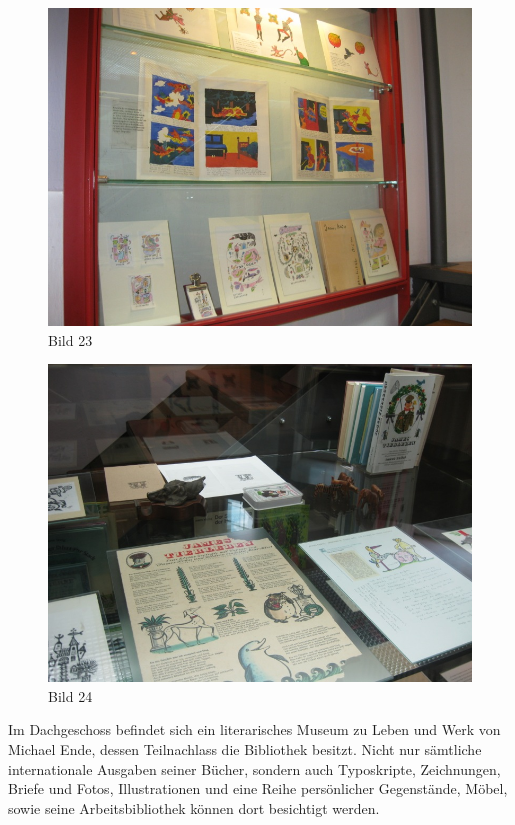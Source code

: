 \documentclass[a4paper,
fontsize=11pt,
oneside,
numbers=noperiodatend,
parskip=half-,
bibliography=totoc,
final
]{scrartcl}
\begin{document}
\begin{figure}[htbp]
\centering
\includegraphics{img/Bild23.jpg}
\caption{Bild 23}
\end{figure}

\begin{figure}[htbp]
\centering
\includegraphics{img/Bild24.jpg}
\caption{Bild 24}
\end{figure}

Im Dachgeschoss befindet sich ein literarisches Museum zu Leben und Werk
von Michael Ende, dessen Teilnachlass die Bibliothek besitzt. Nicht nur
sämtliche internationale Ausgaben seiner Bücher, sondern auch
Typoskripte, Zeichnungen, Briefe und Fotos, Illustrationen und eine
Reihe persönlicher Gegenstände, Möbel, sowie seine Arbeitsbibliothek
können dort besichtigt werden.~
\end{document}
